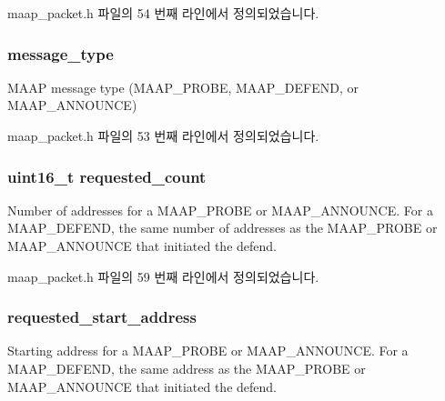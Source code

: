 maap\+\_\+packet.\+h 파일의 54 번째 라인에서 정의되었습니다.

\subsubsection[{\texorpdfstring{message\+\_\+type}{message_type}}]{ message\+\_\+type}\hypertarget{struct_m_a_a_p___packet_aeaaffeace8c23899e558022f62ce6de4}{}\label{struct_m_a_a_p___packet_aeaaffeace8c23899e558022f62ce6de4}
M\+A\+AP message type (M\+A\+A\+P\+\_\+\+P\+R\+O\+BE, M\+A\+A\+P\+\_\+\+D\+E\+F\+E\+ND, or M\+A\+A\+P\+\_\+\+A\+N\+N\+O\+U\+N\+CE) 

maap\+\_\+packet.\+h 파일의 53 번째 라인에서 정의되었습니다.

\subsubsection[{\texorpdfstring{requested\+\_\+count}{requested_count}}]{\setlength{\rightskip}{0pt plus 5cm}uint16\+\_\+t requested\+\_\+count}\hypertarget{struct_m_a_a_p___packet_a3b7ca808f59412368434591249aa8a79}{}\label{struct_m_a_a_p___packet_a3b7ca808f59412368434591249aa8a79}
Number of addresses for a M\+A\+A\+P\+\_\+\+P\+R\+O\+BE or M\+A\+A\+P\+\_\+\+A\+N\+N\+O\+U\+N\+CE. For a M\+A\+A\+P\+\_\+\+D\+E\+F\+E\+ND, the same number of addresses as the M\+A\+A\+P\+\_\+\+P\+R\+O\+BE or M\+A\+A\+P\+\_\+\+A\+N\+N\+O\+U\+N\+CE that initiated the defend. 

maap\+\_\+packet.\+h 파일의 59 번째 라인에서 정의되었습니다.

\subsubsection[{\texorpdfstring{requested\+\_\+start\+\_\+address}{requested_start_address}}]{ requested\+\_\+start\+\_\+address}\hypertarget{struct_m_a_a_p___packet_a6e54c2881571f11a3a4a82c664794326}{}\label{struct_m_a_a_p___packet_a6e54c2881571f11a3a4a82c664794326}
Starting address for a M\+A\+A\+P\+\_\+\+P\+R\+O\+BE or M\+A\+A\+P\+\_\+\+A\+N\+N\+O\+U\+N\+CE. For a M\+A\+A\+P\+\_\+\+D\+E\+F\+E\+ND, the same address as the M\+A\+A\+P\+\_\+\+P\+R\+O\+BE or M\+A\+A\+P\+\_\+\+A\+N\+N\+O\+U\+N\+CE that initiated the defend. 

